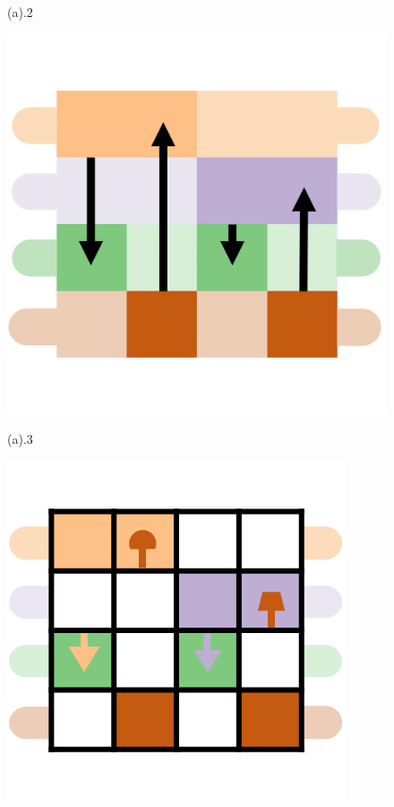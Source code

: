 \begin{figure}[h]
\begin{minipage}{0.24\linewidth}
		\vspace{-1pt}
		\centerline{(a).2}	
		\centerline{\includegraphics[width=\textwidth]{Fig/13.png}}
		\vspace{-1pt}
		\centerline{(a).3}
	\end{minipage}
	\begin{minipage}{0.24\linewidth}
		\centerline{\includegraphics[width=\textwidth]{Fig/21.png}}

\end{minipage}
\end{figure}
